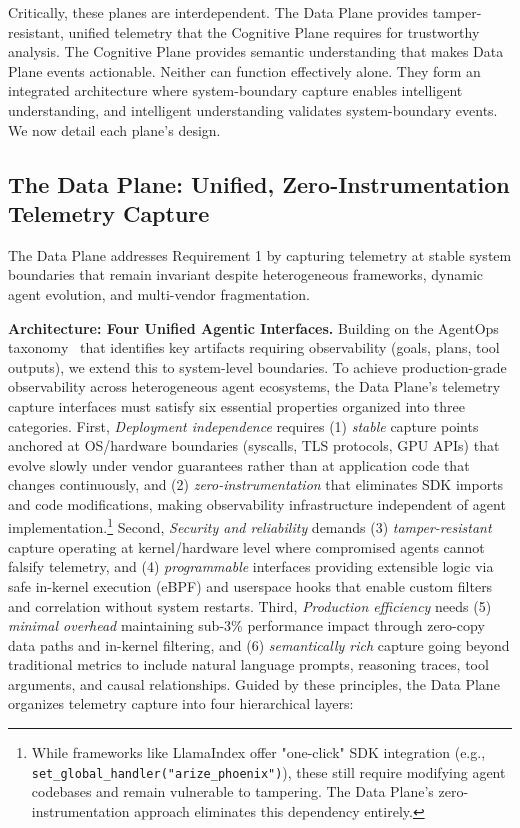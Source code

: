 \documentclass[sigplan,screen,9pt]{acmart}
\begin{document}
Critically, these planes are interdependent. The Data Plane provides tamper-resistant, unified telemetry that the Cognitive Plane requires for trustworthy analysis. The Cognitive Plane provides semantic understanding that makes Data Plane events actionable. Neither can function effectively alone. They form an integrated architecture where system-boundary capture enables intelligent understanding, and intelligent understanding validates system-boundary events. We now detail each plane's design.

\subsection{The Data Plane: Unified, Zero-Instrumentation Telemetry Capture}

The Data Plane addresses Requirement 1 by capturing telemetry at stable system boundaries that remain invariant despite heterogeneous frameworks, dynamic agent evolution, and multi-vendor fragmentation.

\textbf{Architecture: Four Unified Agentic Interfaces.} Building on the AgentOps taxonomy~\cite{Dong2024AgentOps} that identifies key artifacts requiring observability (goals, plans, tool outputs), we extend this to system-level boundaries. To achieve production-grade observability across heterogeneous agent ecosystems, the Data Plane's telemetry capture interfaces must satisfy six essential properties organized into three categories. First, \emph{Deployment independence} requires (1) \emph{stable} capture points anchored at OS/hardware boundaries (syscalls, TLS protocols, GPU APIs) that evolve slowly under vendor guarantees rather than at application code that changes continuously, and (2) \emph{zero-instrumentation} that eliminates SDK imports and code modifications, making observability infrastructure independent of agent implementation.\footnote{While frameworks like LlamaIndex offer "one-click" SDK integration (e.g., \texttt{set\_global\_handler("arize\_phoenix")}), these still require modifying agent codebases and remain vulnerable to tampering. The Data Plane's zero-instrumentation approach eliminates this dependency entirely.} Second, \emph{Security and reliability} demands (3) \emph{tamper-resistant} capture operating at kernel/hardware level where compromised agents cannot falsify telemetry, and (4) \emph{programmable} interfaces providing extensible logic via safe in-kernel execution (eBPF) and userspace hooks that enable custom filters and correlation without system restarts. Third, \emph{Production efficiency} needs (5) \emph{minimal overhead} maintaining sub-3\% performance impact through zero-copy data paths and in-kernel filtering, and (6) \emph{semantically rich} capture going beyond traditional metrics to include natural language prompts, reasoning traces, tool arguments, and causal relationships. Guided by these principles, the Data Plane organizes telemetry capture into four hierarchical layers:
\end{document}
